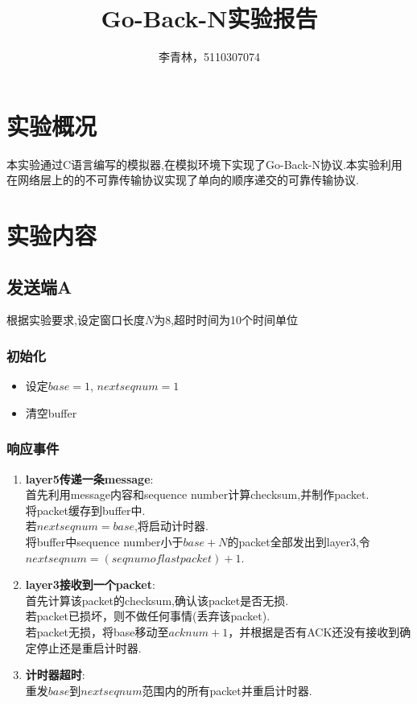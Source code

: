 \documentclass[a4paper,11pt]{article}
\begin{document}
\pagestyle{fancy}
\rfoot{\thepage}
\setlength{\parskip}{0.7ex plus0.2ex minus0.2ex}
\cfoot{\empty}
\lhead{\empty}


\title{Go-Back-N实验报告}
\author{李青林，5110307074}
\date{}
\maketitle

\headheight 3pt
\thispagestyle{fancy}
\section{实验概况}
本实验通过C语言编写的模拟器,在模拟环境下实现了Go-Back-N协议.本实验利用在网络层上的的不可靠传输协议实现了单向的顺序递交的可靠传输协议.
\section{实验内容}
\subsection{发送端A}
根据实验要求,设定窗口长度$N$为8,超时时间为10个时间单位
\subsubsection{初始化}
\begin{itemize}
\item 设定$base=1$, $nextseqnum=1$
\item 清空buffer
\end{itemize}
\subsubsection{响应事件}
\begin{enumerate}
\item \textbf{layer5传递一条message}:\\
首先利用message内容和sequence number计算checksum,并制作packet.\\
将packet缓存到buffer中.\\
若$nextseqnum = base$,将启动计时器.\\
将buffer中sequence number小于$base + N$的packet全部发出到layer3,令$nextseqnum = (seqnum of last packet) + 1$.
\item \textbf{layer3接收到一个packet}:\\
首先计算该packet的checksum,确认该packet是否无损.\\
若packet已损坏，则不做任何事情(丢弃该packet).\\
若packet无损，将base移动至$acknum + 1$，并根据是否有ACK还没有接收到确定停止还是重启计时器.
\item \textbf{计时器超时}:\\
重发$base$到$nextseqnum$范围内的所有packet并重启计时器.
\end{enumerate}
\end{document}
